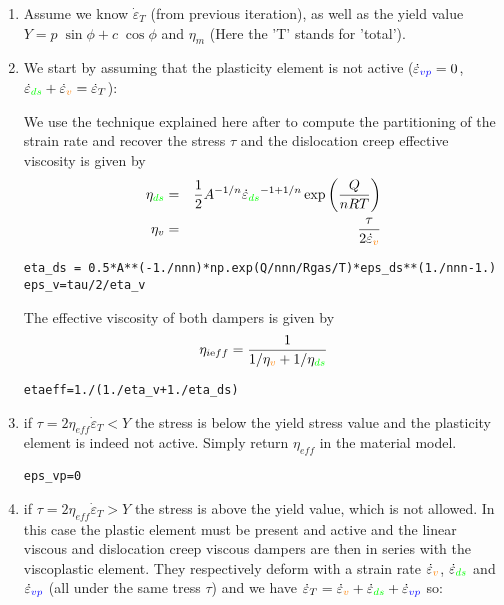 \begin{enumerate}
\item Assume we know $\dot\varepsilon_T$ (from previous iteration), 
as well as the yield value  $Y = p\; \sin\phi + c \; \cos \phi$ and $\eta_m$ (Here the 'T' stands 
for 'total').

\item We start by assuming that the plasticity element is not active 
($\dot{\varepsilon}_{\color{blue}vp}=0$, $\dot{\varepsilon}_{\color{green}ds}
+\dot{\varepsilon}_{\color{orange} v} =\dot{\varepsilon}_T$): 

We use the technique explained here after to compute the partitioning of the strain rate
and recover the stress $\tau$ and the dislocation creep effective viscosity
is given by 
\begin{eqnarray}
\eta_{\color{green}ds} &=& \frac{1}{2} A^{-1/n} 
\dot{\varepsilon}_{\color{green}ds}^{-1+1/n} \exp \left( \frac{Q}{nRT} \right) \nonumber\\
\eta_v &=& \frac{\tau}{2 \dot{\varepsilon}_{\color{orange}v}}  \nonumber
\end{eqnarray}
\begin{lstlisting}
eta_ds = 0.5*A**(-1./nnn)*np.exp(Q/nnn/Rgas/T)*eps_ds**(1./nnn-1.)
eps_v=tau/2/eta_v
\end{lstlisting}
The effective viscosity of both dampers is given by 
\[
\eta_{i\text eff}=\frac{1}{1/\eta_{\color{orange}v}+1/\eta_{\color{green}ds}}
\]
\begin{lstlisting}
etaeff=1./(1./eta_v+1./eta_ds)
\end{lstlisting}

\item if $\tau =2 {\eta}_{eff} \dot\varepsilon_T < Y$ the stress is below the yield stress value 
and the plasticity element is indeed not active. 
Simply return ${\eta}_{eff}$ in the material model.
\begin{lstlisting}
eps_vp=0
\end{lstlisting}

\item if $\tau=2 \eta_{eff} \dot\varepsilon_T > Y$ the stress is above the 
yield value, which is not allowed. In this case the plastic element must be present 
and active and the linear viscous and dislocation creep viscous dampers are then 
in series with the viscoplastic element. 
They  respectively deform with a strain rate $\dot{\varepsilon}_{\color{orange}v}$, 
$\dot{\varepsilon}_{\color{green}ds}$ and $\dot\varepsilon_{\color{blue}vp}$ 
(all under the same tress $\tau$) 
and we have  
$\dot\varepsilon_T = \dot{\varepsilon}_{\color{orange}v} +
\dot{\varepsilon}_{\color{green}ds} + \dot\varepsilon_{\color{blue}vp}$ so:


\end{enumerate}
